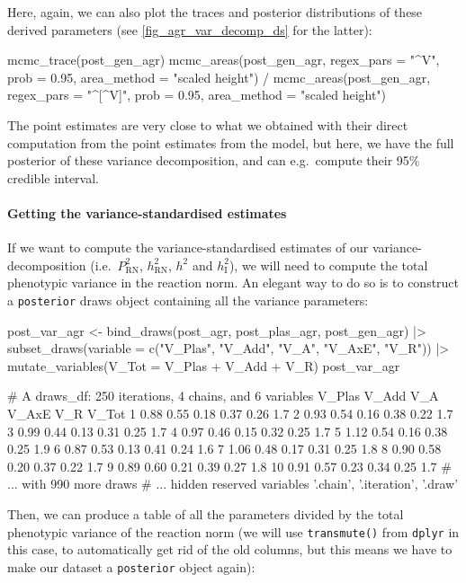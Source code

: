 \documentclass[a4paper,12pt,twoside]{article}
\begin{document}
Here, again, we can also plot the traces and posterior distributions of these derived parameters (see \autoref{fig_agr_var_decomp_ds} for the latter):
\begin{Rinput}
mcmc_trace(post_gen_agr)
mcmc_areas(post_gen_agr,
           regex_pars = "^V",
           prob = 0.95,
           area_method = "scaled height") /
    mcmc_areas(post_gen_agr,
               regex_pars = "^[^V]",
               prob = 0.95,
               area_method = "scaled height")
\end{Rinput}
The point estimates are very close to what we obtained with their direct computation from the point estimates from the model, but here, we have the full posterior of these variance decomposition, and can e.g.\ compute their 95\% credible interval.

\paragraph{Getting the variance-standardised estimates}
If we want to compute the variance-standardised estimates of our variance-decomposition (i.e.\ $P^{2}_{\text{RN}}$, $h^{2}_{\text{RN}}$, $h^{2}$ and $h^{2}_{\text{I}}$), we will need to compute the total phenotypic variance in the reaction norm. An elegant way to do so is to construct a \texttt{posterior} draws object containing all the variance parameters:
\begin{Rinput}
post_var_agr <-
    bind_draws(post_agr, post_plas_agr, post_gen_agr) |>
    subset_draws(variable = c("V_Plas", "V_Add", "V_A", "V_AxE", "V_R")) |>
    mutate_variables(V_Tot = V_Plas + V_Add + V_R)
post_var_agr
\end{Rinput}
\begin{Routput}
# A draws_df: 250 iterations, 4 chains, and 6 variables
   V_Plas V_Add  V_A V_AxE  V_R V_Tot
1    0.88  0.55 0.18  0.37 0.26   1.7
2    0.93  0.54 0.16  0.38 0.22   1.7
3    0.99  0.44 0.13  0.31 0.25   1.7
4    0.97  0.46 0.15  0.32 0.25   1.7
5    1.12  0.54 0.16  0.38 0.25   1.9
6    0.87  0.53 0.13  0.41 0.24   1.6
7    1.06  0.48 0.17  0.31 0.25   1.8
8    0.90  0.58 0.20  0.37 0.22   1.7
9    0.89  0.60 0.21  0.39 0.27   1.8
10   0.91  0.57 0.23  0.34 0.25   1.7
# ... with 990 more draws
# ... hidden reserved variables {'.chain', '.iteration', '.draw'}
\end{Routput}
Then, we can produce a table of all the parameters divided by the total phenotypic variance of the reaction norm (we will use \texttt{transmute()} from \texttt{dplyr} in this case, to automatically get rid of the old columns, but this means we have to make our dataset a \texttt{posterior} object again):
\end{document}

